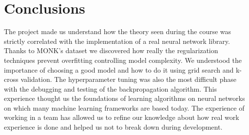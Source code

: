 \section{Conclusions}
The project made us understand how the theory seen during the course was strictly correlated with the implementation of a real neural network library. Thanks to MONK's dataset we discovered how really the regularization techniques prevent overfitting controlling model complexity. We understood the importance of choosing a good model and how to do it using grid search and k-cross validation. The hyperparameter tuning was also the most difficult phase with the debugging and testing of the backpropagation algorithm. This experience thought us the foundations of learning algorithms on neural networks on which many machine learning frameworks are based today. The experience of working in a team has allowed us to refine our knowledge about how real work experience is done and helped us not to break down during development.



